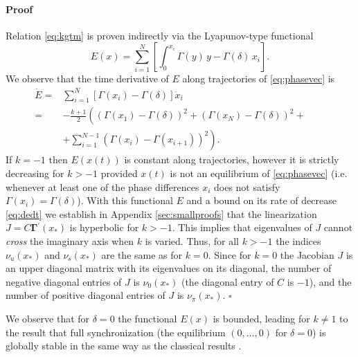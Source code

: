 \documentclass[aps,pre,twocolumn,a4paper,showkeys,showpacs]{revtex4}\usepackage{color}
\theoremstyle{plain}
\theoremstyle{plain}
\begin{document}
\paragraph*{Proof}

Relation \eqref{eq:kgtm} is proven indirectly via the Lyapunov-type
functional
\begin{equation}
E(x)=\sum_{i=1}^{N}\left[  \int_{0}^{x_{i}}\Gamma(y)\,y-\Gamma(\delta
)\,x_{i}\right]  \mbox{.}\label{eq:efunc}\end{equation}
We observe that the time derivative of $E$ along trajectories of
\eqref{eq:phasevec} is
\begin{equation}\begin{split}
\dot{E}= &  \sum_{i=1}^{N}\left[  \Gamma(x_{i})-\Gamma(\delta)\right]  \dot
{x}_{i}\\
= &  -\frac{k+1}{2}\left(  \left(  \Gamma(x_{1})-\Gamma(\delta)\right)
^{2}+\left(  \Gamma(x_{N})-\Gamma(\delta)\right)  ^{2}+\phantom{\sum_i^N}\right.  \\
&  \left.  +\sum_{i=1}^{N-1}\left(  \Gamma(x_{i})-\Gamma(x_{i+1})\right)
^{2}\right)  .
\end{split}
\label{eq:dedt}\end{equation}
If $k=-1$ then $E(x(t))$ is constant along trajectories, however it is
strictly decreasing for $k>-1$ provided $x(t)$ is not an equilibrium of
\eqref{eq:phasevec} (i.e. whenever at least one of the phase differences
$x_{i}$ does not satisfy $\Gamma(x_{i})=\Gamma(\delta)$). With this functional
$E$ and a bound on its rate of decrease \eqref{eq:dedt} we establish in
Appendix \ref{sec:smallproofs} that the linearization
$J=C\mathbf{\boldsymbol{\Gamma\mathrm{^{\prime}}}}(x_{\ast})$ is hyperbolic
for $k>-1$. This implies that eigenvalues of $J$ cannot \emph{cross }the
imaginary axis when $k$ is varied. Thus, for all $k>-1$ the indices $\nu
_{u}(x_{\ast})$ and $\nu_{s}(x_{\ast})$ are the same as for $k=0$. Since for
$k=0$ the Jacobian $J$ is an upper diagonal matrix with its eigenvalues on its
diagonal, the number of negative diagonal entries of $J$ is $\nu_{0}(x_{\ast
})$ (the diagonal entry of $C$ is $-1$), and the number of positive diagonal
entries of $J$ is $\nu_{\pi}(x_{\ast})$. \hfill$\square$

We observe that for $\delta=0$ the functional $E(x)$ is bounded, leading for
$k\neq1$ to the result that full synchronization (the equilibrium
$(0,\ldots,0)$ for $\delta=0$) is globally stable in the same way as the
classical results \cite{hoppensteadt1997weakly}.
\end{document}
